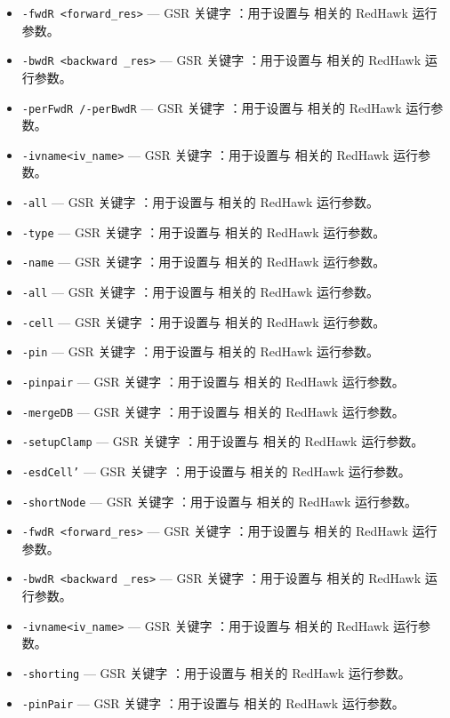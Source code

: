 \begin{itemize}
\item \texttt{-fwdR <forward\_res>} — GSR 关键字 ：用于设置与  相关的 RedHawk 运行参数。
\item \texttt{-bwdR <backward \_res>} — GSR 关键字 ：用于设置与  相关的 RedHawk 运行参数。
\item \texttt{-perFwdR /-perBwdR} — GSR 关键字 ：用于设置与  相关的 RedHawk 运行参数。
\item \texttt{-ivname<iv\_name>} — GSR 关键字 ：用于设置与  相关的 RedHawk 运行参数。
\item \texttt{-all} — GSR 关键字 ：用于设置与  相关的 RedHawk 运行参数。
\item \texttt{-type} — GSR 关键字 ：用于设置与  相关的 RedHawk 运行参数。
\item \texttt{-name} — GSR 关键字 ：用于设置与  相关的 RedHawk 运行参数。
\item \texttt{-all} — GSR 关键字 ：用于设置与  相关的 RedHawk 运行参数。
\item \texttt{-cell} — GSR 关键字 ：用于设置与  相关的 RedHawk 运行参数。
\item \texttt{-pin} — GSR 关键字 ：用于设置与  相关的 RedHawk 运行参数。
\item \texttt{-pinpair} — GSR 关键字 ：用于设置与  相关的 RedHawk 运行参数。
\item \texttt{-mergeDB} — GSR 关键字 ：用于设置与  相关的 RedHawk 运行参数。
\item \texttt{-setupClamp} — GSR 关键字 ：用于设置与  相关的 RedHawk 运行参数。
\item \texttt{-esdCell’} — GSR 关键字 ：用于设置与  相关的 RedHawk 运行参数。
\item \texttt{-shortNode} — GSR 关键字 ：用于设置与  相关的 RedHawk 运行参数。
\item \texttt{-fwdR <forward\_res>} — GSR 关键字 ：用于设置与  相关的 RedHawk 运行参数。
\item \texttt{-bwdR <backward \_res>} — GSR 关键字 ：用于设置与  相关的 RedHawk 运行参数。
\item \texttt{-ivname<iv\_name>} — GSR 关键字 ：用于设置与  相关的 RedHawk 运行参数。
\item \texttt{-shorting} — GSR 关键字 ：用于设置与  相关的 RedHawk 运行参数。
\item \texttt{-pinPair} — GSR 关键字 ：用于设置与  相关的 RedHawk 运行参数。
\end{itemize}

\subsection{}
